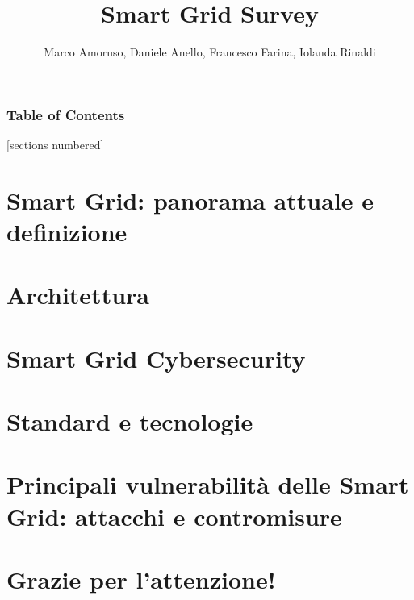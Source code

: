 \documentclass[10pt]{beamer}
\title{Smart Grid Survey}
\subtitle{}
\author{Marco Amoruso, Daniele Anello, Francesco Farina, Iolanda Rinaldi}
\institute{Università degli Studi di Salerno}
\begin{document}
\maketitle

\begin{frame}
  \frametitle{Table of Contents}
  [sections numbered]
  \tableofcontents[hideallsubsections]
\end{frame}


\section{Smart Grid: panorama attuale e definizione}


\section{Architettura}


\section{Smart Grid Cybersecurity}


\section{Standard e tecnologie}


\section{Principali vulnerabilità delle Smart Grid: attacchi e contromisure}


{\renewcommand{\addtocontents}[2]{}
\section*{Grazie per l'attenzione!}}
\end{document}
